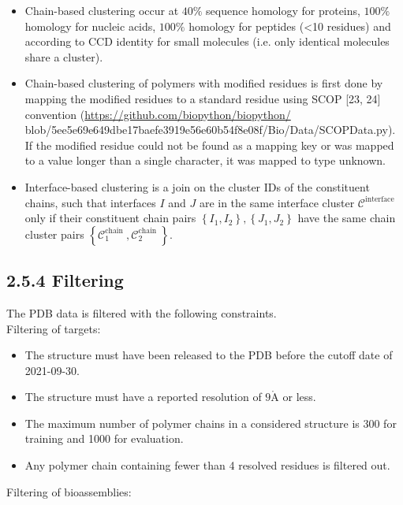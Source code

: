 \documentclass[10pt]{article}
\def\AA{\mathring{\mathrm{A}}}
\begin{document}
\begin{itemize}
  \item Chain-based clustering occur at $40 \%$ sequence homology for proteins, $100 \%$ homology for nucleic acids, $100 \%$ homology for peptides (<10 residues) and according to CCD identity for small molecules (i.e. only identical molecules share a cluster).
  \item Chain-based clustering of polymers with modified residues is first done by mapping the modified residues to a standard residue using SCOP [23, 24] convention (\href{https://github.com/biopython/biopython/}{https://github.com/biopython/biopython/} blob/5ee5e69e649dbe17baefe3919e56e60b54f8e08f/Bio/Data/SCOPData.py). If the modified residue could not be found as a mapping key or was mapped to a value longer than a single character, it was mapped to type unknown.
  \item Interface-based clustering is a join on the cluster IDs of the constituent chains, such that interfaces $I$ and $J$ are in the same interface cluster $\mathcal{C}^{\text {interface }}$ only if their constituent chain pairs $\left\{I_{1}, I_{2}\right\},\left\{J_{1}, J_{2}\right\}$ have the same chain cluster pairs $\left\{\mathcal{C}_{1}^{\text {chain }}, \mathcal{C}_{2}^{\text {chain }}\right\}$.
\end{itemize}

\subsection*{2.5.4 Filtering}
The PDB data is filtered with the following constraints.\\
Filtering of targets:

\begin{itemize}
  \item The structure must have been released to the PDB before the cutoff date of 2021-09-30.
  \item The structure must have a reported resolution of $9 \AA$ or less.
  \item The maximum number of polymer chains in a considered structure is 300 for training and 1000 for evaluation.
  \item Any polymer chain containing fewer than 4 resolved residues is filtered out.
\end{itemize}

Filtering of bioassemblies:
\end{document}
